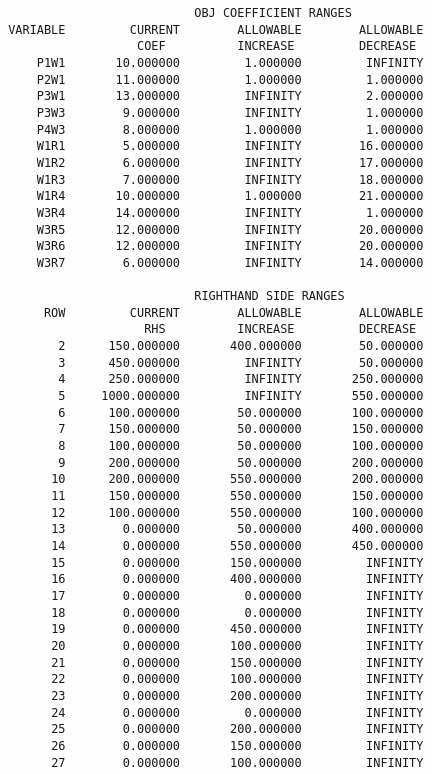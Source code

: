 \begin{verbatim}
                           OBJ COEFFICIENT RANGES
 VARIABLE         CURRENT        ALLOWABLE        ALLOWABLE
                   COEF          INCREASE         DECREASE
     P1W1       10.000000         1.000000         INFINITY
     P2W1       11.000000         1.000000         1.000000
     P3W1       13.000000         INFINITY         2.000000
     P3W3        9.000000         INFINITY         1.000000
     P4W3        8.000000         1.000000         1.000000
     W1R1        5.000000         INFINITY        16.000000
     W1R2        6.000000         INFINITY        17.000000
     W1R3        7.000000         INFINITY        18.000000
     W1R4       10.000000         1.000000        21.000000
     W3R4       14.000000         INFINITY         1.000000
     W3R5       12.000000         INFINITY        20.000000
     W3R6       12.000000         INFINITY        20.000000
     W3R7        6.000000         INFINITY        14.000000

                           RIGHTHAND SIDE RANGES
      ROW         CURRENT        ALLOWABLE        ALLOWABLE
                    RHS          INCREASE         DECREASE
        2      150.000000       400.000000        50.000000
        3      450.000000         INFINITY        50.000000
        4      250.000000         INFINITY       250.000000
        5     1000.000000         INFINITY       550.000000
        6      100.000000        50.000000       100.000000
        7      150.000000        50.000000       150.000000
        8      100.000000        50.000000       100.000000
        9      200.000000        50.000000       200.000000
       10      200.000000       550.000000       200.000000
       11      150.000000       550.000000       150.000000
       12      100.000000       550.000000       100.000000
       13        0.000000        50.000000       400.000000
       14        0.000000       550.000000       450.000000
       15        0.000000       150.000000         INFINITY
       16        0.000000       400.000000         INFINITY
       17        0.000000         0.000000         INFINITY
       18        0.000000         0.000000         INFINITY
       19        0.000000       450.000000         INFINITY
       20        0.000000       100.000000         INFINITY
       21        0.000000       150.000000         INFINITY
       22        0.000000       100.000000         INFINITY
       23        0.000000       200.000000         INFINITY
       24        0.000000         0.000000         INFINITY
       25        0.000000       200.000000         INFINITY
       26        0.000000       150.000000         INFINITY
       27        0.000000       100.000000         INFINITY
\end{verbatim}


